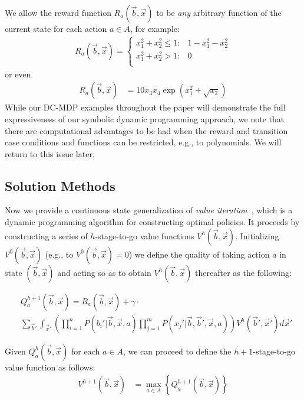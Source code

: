 \documentclass[letterpaper]{article}
\begin{document}
We allow 
the reward function $R_a(\vec{b},\vec{x})$
to be \emph{any} arbitrary function of the current state
for each action $a \in A$, for example:
\begin{align}
R_a(\vec{b},\vec{x}) = \begin{cases}
x_1^2 + x_2^2 \leq 1 : & 1 - x_1^2 - x_2^2  \\
x_1^2 + x_2^2 > 1 : & 0 \\
\end{cases} \label{eq:simple_reward}
\end{align}
or even 
\begin{align}
R_a(\vec{b},\vec{x}) & = 10 x_3 x_4 \exp(x_1^2 + \sqrt{x_2}) \label{eq:expr_reward}
\end{align}
While our DC-MDP examples throughout the paper will demonstrate the
full expressiveness of our symbolic dynamic programming approach,
we note that there are computational advantages to be had when
the reward and transition case conditions and 
functions can be restricted, e.g., to
polynomials.  We will return to this issue later.

\subsection{Solution Methods}

\label{sec:soln}

Now we provide a continuous state generalization of {\it
value iteration}~\cite{bellman}, which is a dynamic programming
algorithm for constructing optimal policies.  It proceeds by
constructing a series of $h$-stage-to-go value functions
$V^h(\vec{b},\vec{x})$.  Initializing $V^0(\vec{b},\vec{x})$ 
(e.g., to $V^0(\vec{b},\vec{x}) = 0$) 
we define the quality of taking action $a$ in state
$(\vec{b},\vec{x})$ and acting so as to obtain $V^{h}(\vec{b},\vec{x})$ 
thereafter as the following:
\vspace{-3mm}

{\footnotesize
\begin{align}
& Q_a^{h+1}(\vec{b},\vec{x}) = R_a(\vec{b},\vec{x}) + \gamma \cdot \label{eq:qfun} \\ 
& \sum_{\vec{b}'} \int_{\vec{x}'} \left( \prod_{i=1}^n P(b_i'|\vec{b},\vec{x},a) \prod_{j=1}^m P(x_j'|\vec{b},\vec{b}',\vec{x},a) \right) V^h(\vec{b}',\vec{x}') d\vec{x}' \nonumber
\end{align}}

Given $Q_a^h(\vec{b},\vec{x})$ for each $a \in A$, we can proceed
to define the $h+1$-stage-to-go value function as follows:
\begin{align}
V^{h+1}(\vec{b},\vec{x}) & = \max_{a \in A} \left\{ Q^{h+1}_a(\vec{b},\vec{x}) \right\} \label{eq:vfun}
\end{align}
\end{document}
